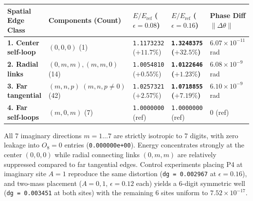 \documentclass[
  a4paper,
]{article}
\newcounter{none} %
\begin{document}
{\def\LTcaptype{none} %
\begin{longtable}[]{@{}
  >{\raggedright\arraybackslash}p{}
  >{\raggedright\arraybackslash}p{}
  >{\centering\arraybackslash}p{}
  >{\centering\arraybackslash}p{}
  >{\centering\arraybackslash}p{}@{}}
\toprule\noalign{}
\begin{minipage}[b]{\linewidth}\raggedright
Spatial Edge Class
\end{minipage} & \begin{minipage}[b]{\linewidth}\raggedright
Components (Count)
\end{minipage} & \begin{minipage}[b]{\linewidth}\centering
\(E/E_{\mathrm{ref}}\) (\(\epsilon=0.08\))
\end{minipage} & \begin{minipage}[b]{\linewidth}\centering
\(E/E_{\mathrm{ref}}\) (\(\epsilon=0.16\))
\end{minipage} & \begin{minipage}[b]{\linewidth}\centering
Phase Diff \(\|\Delta\theta\|\)
\end{minipage} \\
\midrule\noalign{}
\endhead
\bottomrule\noalign{}
\endlastfoot
\textbf{1. Center self-loop} & \((0, 0, 0)\) (1) & \texttt{1.1173232}
(\(+11.7\%\)) & \textbf{\texttt{1.3248375} (\(+32.5\%\))} &
\(6.07 \times 10^{-11}\) rad \\
\textbf{2. Radial links} & \((0, m, m), (m, m, 0)\) (14) &
\texttt{1.0054810} (\(+0.55\%\)) & \textbf{\texttt{1.0122646}
(\(+1.23\%\))} & \(6.08 \times 10^{-9}\) rad \\
\textbf{3. Far tangential} & \((m, n, p)\; (m,n,p\neq 0)\) (42) &
\texttt{1.0257321} (\(+2.57\%\)) & \textbf{\texttt{1.0718855}
(\(+7.19\%\))} & \(6.10 \times 10^{-9}\) rad \\
\textbf{4. Far self-loops} & \((m, 0, m)\) (7) & \texttt{1.0000000}
(ref) & \texttt{1.0000000} (ref) & \(0\) (ref) \\
\end{longtable}
}

All 7 imaginary directions \(m = 1 \dots 7\) are strictly isotropic to 7
digits, with zero leakage into \(O_8 = 0\) entries
(\texttt{0.000000e+00}). Energy concentrates strongly at the center
\((0,0,0)\) while radial connecting links \((0,m,m)\) are relatively
suppressed compared to far tangential edges. Control experiments placing
P4 at imaginary site \(A = 1\) reproduce the same distortion
(\texttt{dg\ =\ 0.002967} at \(\epsilon = 0.16\)), and two-mass
placement (\(A = 0, 1\), \(\epsilon = 0.12\) each) yields a 6-digit
symmetric well (\texttt{dg\ =\ 0.003451} at both sites) with the
remaining 6 sites uniform to \(7.52 \times 10^{-17}\).
\end{document}
